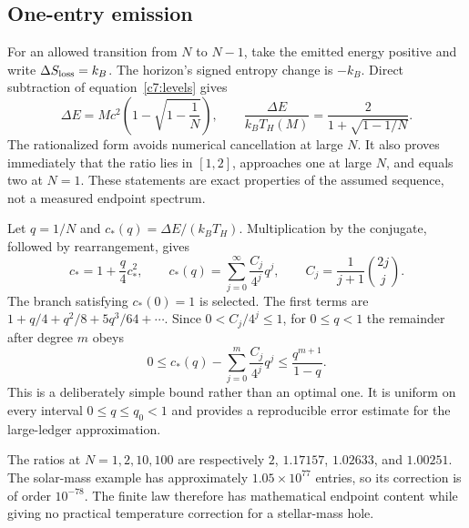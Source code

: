 \subsection{One-entry emission}
For an allowed transition from $N$ to $N-1$, take the emitted energy positive and write $\Delta S_{\rm loss}=k_B$. The horizon's signed entropy change is $-k_B$. Direct subtraction of equation~\eqref{c7:levels} gives
\begin{equation}
 \Delta E=Mc^2\left(1-\sqrt{1-\frac1N}\right),\qquad
 \frac{\Delta E}{k_BT_H(M)}
 =\frac{2}{1+\sqrt{1-1/N}}.
 \label{c7:onestep}
\end{equation}
The rationalized form avoids numerical cancellation at large $N$. It also proves immediately that the ratio lies in $[1,2]$, approaches one at large $N$, and equals two at $N=1$. These statements are exact properties of the assumed sequence, not a measured endpoint spectrum.

Let $q=1/N$ and $c_*(q)=\Delta E/(k_BT_H)$. Multiplication by the conjugate, followed by rearrangement, gives
\begin{equation}
 c_*=1+\frac q4c_*^2,
 \qquad c_*(q)=\sum_{j=0}^{\infty}\frac{C_j}{4^j}q^j,
 \qquad C_j=\frac{1}{j+1}\binom{2j}{j}.
 \label{c7:catalan}
\end{equation}
The branch satisfying $c_*(0)=1$ is selected. The first terms are $1+q/4+q^2/8+5q^3/64+\cdots$. Since $0<C_j/4^j\le1$, for $0\le q<1$ the remainder after degree $m$ obeys
\begin{equation}
 0\le c_*(q)-\sum_{j=0}^{m}\frac{C_j}{4^j}q^j
 \le\frac{q^{m+1}}{1-q}.
 \label{c7:remainder}
\end{equation}
This is a deliberately simple bound rather than an optimal one. It is uniform on every interval $0\le q\le q_0<1$ and provides a reproducible error estimate for the large-ledger approximation.

The ratios at $N=1,2,10,100$ are respectively $2$, $1.17157$, $1.02633$, and $1.00251$. The solar-mass example has approximately $1.05\times10^{77}$ entries, so its correction is of order $10^{-78}$. The finite law therefore has mathematical endpoint content while giving no practical temperature correction for a stellar-mass hole.

